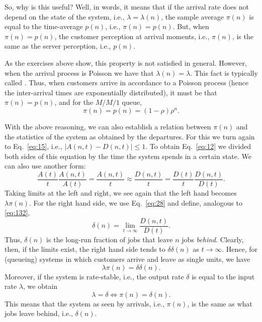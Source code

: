 So, why is this useful? Well, in words, it means that if the arrival
rate does not depend on the state of the system, i.e.,
$\lambda=\lambda(n)$, the sample average $\pi(n)$ is equal to the
time-average $p(n)$, i.e., $\pi(n)=p(n)$. But, when $\pi(n)=p(n)$, the
customer perception at arrival moments, i.e., $\pi(n)$, is the same as
the server perception, i.e., $p(n)$.

As the exercises above show, this property is not satisfied in
general.  However,  when the arrival process is
Poisson we have that $\lambda(n)=\lambda$. This fact is typically called . Thus, when customers arrive in
accordance to a Poisson process (hence the inter-arrival times are
exponentially distributed), it must be that $\pi(n) = p(n)$, and
for the $M/M/1$ queue,
\begin{equation*}
  \pi(n) = p(n) = (1-\rho)\rho^n.
\end{equation*}


With the above reasoning, we can also establish a relation between
$\pi(n)$ and the statistics of the system as obtained by the
departures. For this we
turn again to Eq.~\eqref{eq:15}, i.e., $|A(n,t) - D(n,t)| \leq 1$. To
obtain Eq.~\eqref{eq:12} we divided both sides of this equation by the
time the system spends in a certain state. We can also use another
form:
\begin{equation*}
\frac{A(t)}t \frac{A(n,t)}{A(t)} = \frac{A(n,t)}t \approx \frac{D(n,t)}t 
= \frac{D(t)}t \frac{D(n,t)}{D(t)}.
\end{equation*}
Taking limits at the left and right, we see again that the left hand
becomes $\lambda \pi(n)$. For the right hand side, we use
Eq.~\eqref{eq:28} and define, analogous to \eqref{eq:132}, 
\begin{equation}
  \label{eq:33}
  \delta(n) = \lim_{t\to\infty} \frac{D(n,t)}{D(t)}.
\end{equation}
Thus, $\delta(n)$ is the long-run fraction of jobs that leave $n$ jobs
\emph{behind}. Clearly, then, if the limits exist, the right hand side
tends to $\delta \delta(n)$ as $t\to\infty$. Hence, for (queueing)
systems in which customers arrive and leave as single units, we have
\begin{equation}
  \label{eq:36}
  \lambda \pi(n) = \delta \delta(n).
\end{equation}
Moreover, if the system is rate-stable, i.e., the output rate $\delta$ is equal to the input rate $\lambda$, we obtain
\begin{equation}
  \label{eq:39}
\lambda = \delta \iff  \pi(n) = \delta(n).
\end{equation}
This means that the system as seen by arrivals, i.e., $\pi(n)$, is
the same as what jobs leave behind, i.e., $\delta(n)$.


